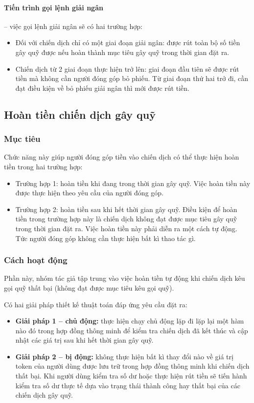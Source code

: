 \documentclass[../main-report.tex]{subfiles}
\begin{document}
\paragraph{Tiến trình gọi lệnh giải ngân} -- việc gọi lệnh giải ngân sẽ có hai trường hợp:

\begin{itemize}
\item Đối với chiến dịch chỉ có một giai đoạn giải ngân: được rút toàn bộ số tiền gây quỹ được nếu hoàn thành mục tiêu gây quỹ trong thời gian đặt ra.
\item Chiến dịch từ 2 giai đoạn thực hiện trở lên: giai đoạn đầu tiên sẽ được rút tiền mà không cần người đóng góp bỏ phiếu. Từ giai đoạn thứ hai trở đi, cần đạt điều kiện về bỏ phiếu giải ngân thì mới được rút tiền.
\end{itemize}

\subsection{Hoàn tiền chiến dịch gây quỹ}
\subsubsection{Mục tiêu}
Chức năng này giúp người đóng góp tiền vào chiến dịch có thể thực hiện hoàn tiền trong hai trường hợp:

\begin{itemize}
\item Trường hợp 1: hoàn tiền khi đang trong thời gian gây quỹ. Việc hoàn tiền này được thực hiện theo yêu cầu của người đóng góp.
\item Trường hợp 2: hoàn tiền sau khi hết thời gian gây quỹ. Điều kiện để hoàn tiền trong trường hợp này là chiến dịch không đạt được mục tiêu gây quỹ trong thời gian đặt ra. Việc hoàn tiền này phải diễn ra một cách tự động. Tức người đóng góp không cần thực hiện bất kì thao tác gì.
\end{itemize}

\subsubsection{Cách hoạt động}
Phần này, nhóm tác giả tập trung vào việc hoàn tiền tự động khi chiến dịch kêu gọi quỹ thất bại (không đạt được mục tiêu kêu gọi quỹ).

Có hai giải pháp thiết kế thuật toán đáp ứng yêu cầu đặt ra:

\begin{itemize}
\item \textbf{Giải pháp 1 -- chủ động:} thực hiện chạy chủ động lặp đi lặp lại một hàm nào đó trong hợp đồng thông minh để kiểm tra chiến dịch đã kết thúc và cập nhật các giá trị sau khi hết thời gian gây quỹ.
\item \textbf{Giải pháp 2 -- bị động:} không thực hiện bất kì thay đổi nào về giá trị token của người dùng được lưu trữ trong hợp đồng thông minh khi chiến dịch thất bại. Khi người dùng kiểm tra số dư hoặc thực hiện rút tiền sẽ tiến hành kiểm tra số dư thực tế dựa vào trạng thái thành công hay thất bại của các chiến dịch gây quỹ.
\end{itemize}
\end{document}
